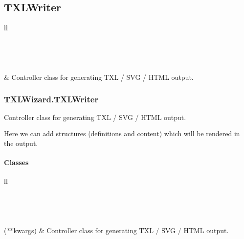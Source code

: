 \documentclass[letterpaper,10pt,english]{sphinxmanual}
\begin{document}
\subsection{TXLWriter}
\label{Chapters/40_PythonModuleReference:txlwriter}
\begin{longtable}{ll}
\hline
\endfirsthead

%
{{}} \\
\hline
\endhead

\hline {} \\ \hline
\endfoot

\endlastfoot


{\hyperref[Chapters/PythonModuleReference/TXLWriter/TXLWizard.TXLWriter:module\string-TXLWizard.TXLWriter]{}}
 & 
Controller class for generating TXL / SVG / HTML output.
\\
\hline\end{longtable}



\subsubsection{TXLWizard.TXLWriter}
\label{Chapters/PythonModuleReference/TXLWriter/TXLWizard.TXLWriter:txlwizard-txlwriter}\label{Chapters/PythonModuleReference/TXLWriter/TXLWizard.TXLWriter:module-TXLWizard.TXLWriter}\label{Chapters/PythonModuleReference/TXLWriter/TXLWizard.TXLWriter::doc}
Controller class for generating TXL / SVG / HTML output.

Here we can add structures (definitions and content) which will be rendered in the output.


\paragraph{Classes}
\label{Chapters/PythonModuleReference/TXLWriter/TXLWizard.TXLWriter:classes}
\begin{longtable}{ll}
\hline
\endfirsthead

%
{{}} \\
\hline
\endhead

\hline {} \\ \hline
\endfoot

\endlastfoot


{\hyperref[Chapters/PythonModuleReference/TXLWriter/TXLWizard.TXLWriter:TXLWizard.TXLWriter.TXLWriter]{}}(**kwargs)
 & 
Controller class for generating TXL / SVG / HTML output.
\\
\hline\end{longtable}
\end{document}
